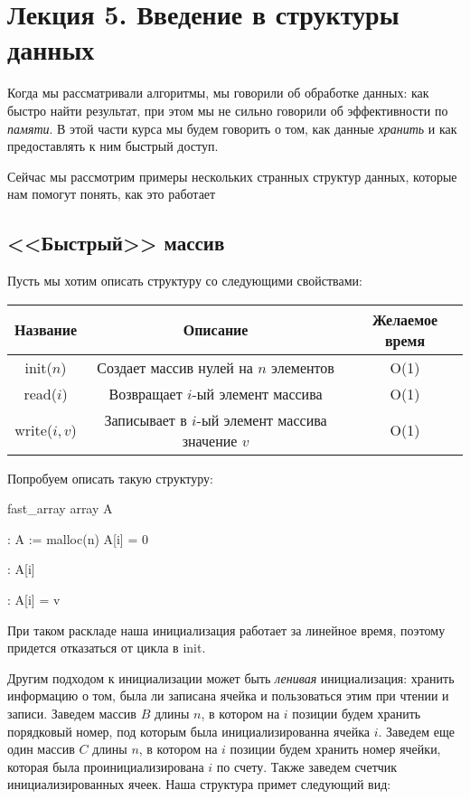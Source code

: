 \documentclass[../main.tex]{subfiles}
\begin{document}
	\section{Лекция 5. Введение в структуры данных}
	
	Когда мы рассматривали алгоритмы, мы говорили об обработке данных: как быстро найти результат, при этом мы не сильно говорили об эффективности по \textit{памяти}. В этой части курса мы будем говорить о том, как данные \textit{хранить} и как предоставлять к ним быстрый доступ.
	
	Сейчас мы рассмотрим примеры нескольких странных структур данных, которые нам помогут понять, как это работает
	
	\subsection{<<Быстрый>> массив}
	
	Пусть мы хотим описать структуру со следующими свойствами:
	\begin{center}
		\begin{tabular}{c|c|c}
			Название 		& Описание 											& Желаемое время\\ \hline
			init($n$)  		& Создает массив нулей на $n$ элементов	 			& O(1) 			\\ \hline
			read($i$)  		& Возвращает $i$-ый элемент массива					& O(1)			\\ \hline
			write($i, v$) 	& Записывает в $i$-ый элемент массива значение $v$  & O(1)
		\end{tabular}
	\end{center}
	
	Попробуем описать такую структуру:
	
	\begin{struct}{fast\_array}
		\State array A
		
		:
		\State A := malloc(n)
			\State A[i] = 0
		\EndFor
		\EndFunction
		
		:
		\State \Return A[i]
		\EndFunction
		
		:
		\State A[i] = v
		\EndFunction
	\end{struct}
	
	При таком раскладе наша инициализация работает за линейное время, поэтому придется отказаться от цикла в init.
	
	Другим подходом к инициализации может быть \textit{ленивая} инициализация: хранить информацию о том, была ли записана ячейка и пользоваться этим при чтении и записи. Заведем массив $B$ длины $n$, в котором на $i$ позиции будем хранить порядковый номер, под которым была инициализированна ячейка $i$. Заведем еще один массив $C$ длины $n$, в котором на $i$ позиции будем хранить номер ячейки, которая была проинициализирована $i$ по счету. Также заведем счетчик инициализированных ячеек. Наша структура примет следующий вид:
\end{document}
